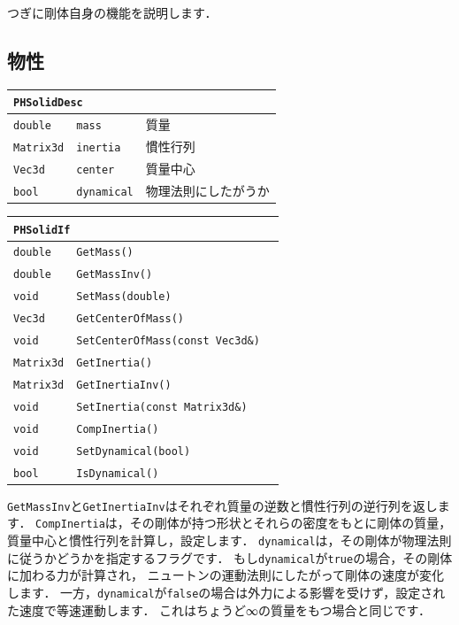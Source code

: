 \KLUDGE つぎに剛体自身の機能を説明します．

\subsection*{物性}

\begin{center}
\begin{tabular}{p{.15\hsize}p{.45\hsize}p{.30\hsize}}
\multicolumn{3}{l}{\texttt{PHSolidDesc}}							\\ \midrule
\texttt{double}		&	\texttt{mass}		& 質量					\\
\texttt{Matrix3d}	&	\texttt{inertia}	& 慣性行列				\\
\texttt{Vec3d}		&	\texttt{center}		& 質量中心				\\
\texttt{bool}		&	\texttt{dynamical}	& 物理法則にしたがうか	\\
\end{tabular}
\end{center}

\begin{center}
\begin{tabular}{p{.15\hsize}p{.45\hsize}p{.30\hsize}}
\multicolumn{3}{l}{\texttt{PHSolidIf}}								\\ \midrule
\texttt{double}		& \texttt{GetMass()}						& \\
\texttt{double} 	& \texttt{GetMassInv()}						& \\
\texttt{void} 		& \texttt{SetMass(double)}					& \\
\texttt{Vec3d} 		& \texttt{GetCenterOfMass()}				& \\
\texttt{void} 		& \texttt{SetCenterOfMass(const Vec3d\&)}	& \\
\texttt{Matrix3d} 	& \texttt{GetInertia()}						& \\
\texttt{Matrix3d} 	& \texttt{GetInertiaInv()}					& \\
\texttt{void} 		& \texttt{SetInertia(const Matrix3d\&)}		& \\
\texttt{void} 		& \texttt{CompInertia()}					& \\
\texttt{void} 		& \texttt{SetDynamical(bool)}				& \\
\texttt{bool} 		& \texttt{IsDynamical()}					& \\
\end{tabular}
\end{center}

\texttt{GetMassInv}と\texttt{GetInertiaInv}はそれぞれ質量の逆数と慣性行列の逆行列を返します．
\texttt{CompInertia}は，その剛体が持つ形状とそれらの密度をもとに剛体の質量，質量中心と慣性行列を計算し，設定します．
\texttt{dynamical}は，その剛体が物理法則に従うかどうかを指定するフラグです．
\KLUDGE もし\texttt{dynamical}が\texttt{true}の場合，その剛体に加わる力が計算され，
\KLUDGE ニュートンの運動法則にしたがって剛体の速度が変化します．
\KLUDGE 一方，\texttt{dynamical}が\texttt{false}の場合は外力による影響を受けず，設定された速度で等速運動します．
\KLUDGE これはちょうど∞の質量をもつ場合と同じです．


